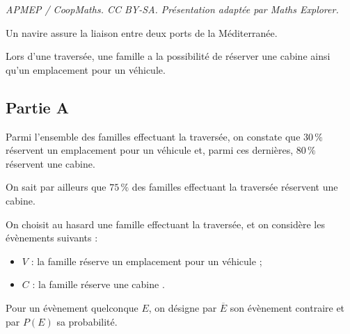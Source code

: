 \documentclass[10pt]{article}
\begin{document}
\noindent\textit{APMEP / CoopMaths. CC BY-SA. Présentation adaptée par Maths Explorer.}\par\medskip
Un navire assure la liaison entre deux ports de la Méditerranée.

	Lors d'une traversée, une famille a la possibilité de réserver une cabine ainsi qu'un emplacement pour un véhicule.

	\subsection*{Partie A}

	Parmi l'ensemble des familles effectuant la traversée, on constate que $30\,\%$ réservent un emplacement pour un véhicule et, parmi ces dernières, $80\,\%$ réservent une cabine.

	On sait par ailleurs que $75\,\%$ des familles effectuant la traversée réservent une cabine.

	\medskip

	On choisit au hasard une famille effectuant la traversée, et on considère les évènements suivants :

	\begin{itemize}[label={\textbullet~}]
		\item $V$ : \og  la famille réserve un emplacement pour un véhicule \fg{};

		\item $C$ : \og  la famille réserve une cabine \fg{} .
	\end{itemize}

	Pour un évènement quelconque $E$, on désigne par $\overline{E}$ son évènement contraire et par $P(E)$ sa probabilité.
\end{document}
